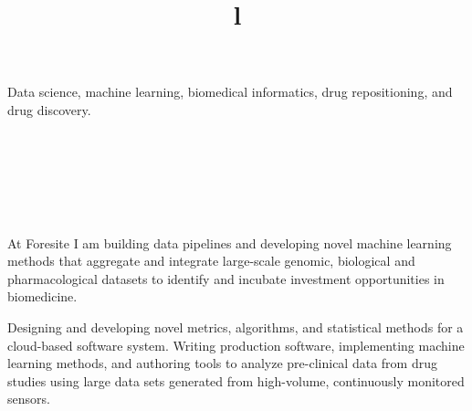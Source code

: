 \begin{resume}



\section{}
Data science, machine learning, biomedical informatics, drug repositioning, and drug discovery.


\section{}
\begin{format}
  \\
  \title{l}\\
  \body\\
\end{format}


\title{\small{}}
\begin{position}
At Foresite I am building data pipelines and developing novel machine learning methods that aggregate and integrate large-scale genomic, biological and pharmacological datasets to identify and incubate investment opportunities in biomedicine.
\end{position}

\vspace{-0.5em}

\title{\small{}}
\begin{position}
Designing and developing novel metrics, algorithms, and statistical methods for a cloud-based software system.  Writing production software, implementing machine learning methods, and authoring tools to analyze pre-clinical data from drug studies using large data sets generated from high-volume, continuously monitored sensors.
\end{position}


\end{resume}
